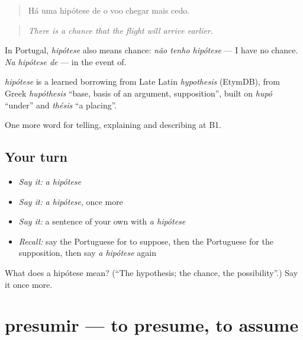 \begin{quote}
Há uma hipótese de o voo chegar mais cedo.
\end{quote}

\begin{quote}
\emph{There is a chance that the flight will arrive earlier.}
\end{quote}

In Portugal, \emph{hipótese} also means chance: \emph{não tenho hipótese} — I have no chance. \emph{Na hipótese de} — in the event of.

\begin{cousinweb}
\emph{hipótese} is a learned borrowing from Late Latin \emph{hypothesis} (EtymDB), from Greek \emph{hupóthesis} \textquotedblleft{}base, basis of an argument, supposition\textquotedblright{}, built on \emph{hupó} \textquotedblleft{}under\textquotedblright{} and \emph{thésis} \textquotedblleft{}a placing\textquotedblright{}.
\end{cousinweb}

\begin{grammarlens}[title={What you've built}]
One more word for telling, explaining and describing at B1.
\end{grammarlens}

\subsection*{Your turn}
\begin{itemize}
\raggedright
  \item \emph{Say it:} \emph{a hipótese}
  \item \emph{Say it:} \emph{a hipótese}, once more
  \item \emph{Say it:} a sentence of your own with \emph{a hipótese}
  \item \emph{Recall:} say the Portuguese for to suppose, then the Portuguese for the supposition, then say \emph{a hipótese} again
\end{itemize}

\begin{tcolorbox}[breakable,colback=teal!4,colframe=teal!35!black,title={Before you move on}]
What does a hipótese mean? (\textquotedblleft{}The hypothesis; the chance, the possibility\textquotedblright{}.) Say it once more.
\end{tcolorbox}
\section[presumir]{presumir — to presume, to assume}

